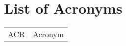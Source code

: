 \section*{List of Acronyms}

\begin{longtable}{p{3cm}p{11.5cm}}
	
ACR       & Acronym\\

\end{longtable}
